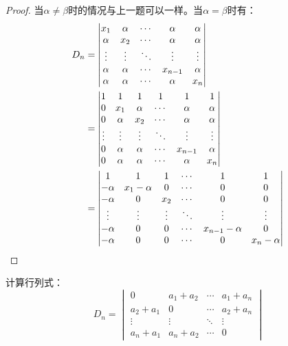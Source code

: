 \begin{proof}
	当$\alpha\ne\beta$时的情况与上一题可以一样。当$\alpha=\beta$时有：
	\begin{align*}
		D_n&=
		\begin{vmatrix}
			x_1 & \alpha & \cdots & \alpha & \alpha \\
			\alpha & x_2 & \cdots & \alpha & \alpha \\
			\vdots & \vdots & \ddots & \vdots & \vdots \\
			\alpha & \alpha & \cdots & x_{n-1} & \alpha \\
			\alpha & \alpha & \cdots & \alpha & x_n
		\end{vmatrix} \\
		&=
		\begin{vmatrix}
			1 & 1 & 1 & 1 & 1 & 1 \\
			0 & x_1 & \alpha & \cdots & \alpha & \alpha \\
			0 & \alpha & x_2 & \cdots & \alpha & \alpha \\
			\vdots & \vdots & \vdots & \ddots & \vdots & \vdots \\
			0 & \alpha & \alpha & \cdots & x_{n-1} & \alpha \\
			0 & \alpha & \alpha & \cdots & \alpha & x_n
		\end{vmatrix} \\
		&=
		\begin{vmatrix}
			1 & 1 & 1 & \cdots & 1 & 1 \\
			-\alpha & x_1-\alpha & 0 & \cdots & 0 & 0 \\
			-\alpha & 0 & x_2 & \cdots & 0 & 0 \\
			\vdots & \vdots & \vdots & \ddots & \vdots & \vdots \\
			-\alpha & 0 & 0 & \cdots & x_{n-1}-\alpha & 0 \\
			-\alpha & 0 & 0 & \cdots & 0 & x_n-\alpha
		\end{vmatrix}\qedhere
	\end{align*}
\end{proof}
\begin{theorem}
	计算行列式：
	\begin{equation*}
		D_n=
		\begin{vmatrix}
			0 & a_1+a_2 & \cdots & a_1+a_n \\
			a_2+a_1 & 0 & \cdots & a_2+a_n \\
			\vdots & \vdots & \ddots & \vdots \\
			a_n+a_1 & a_n+a_2 & \cdots & 0
		\end{vmatrix}
	\end{equation*}
\end{theorem}
